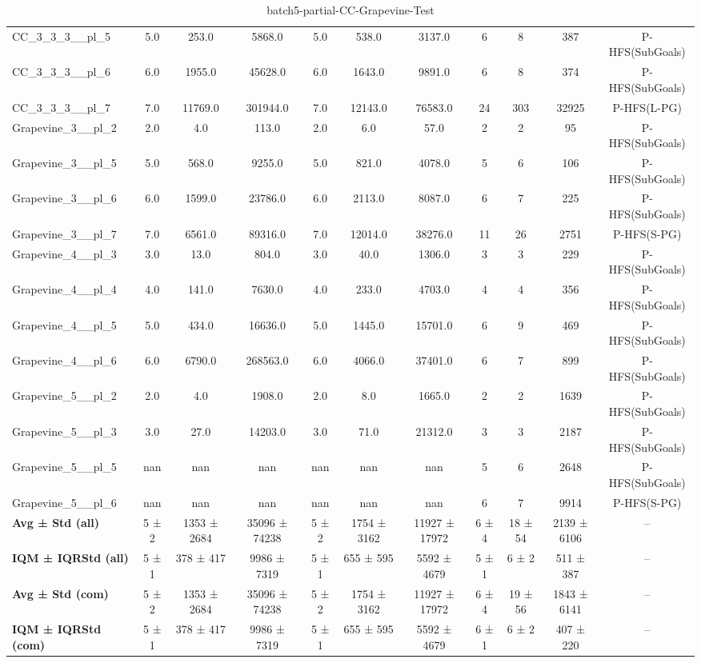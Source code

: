 \begin{table}[!ht]
\begin{tabular}{l|ccc|ccc|cccc}
CC\_3\_3\_3\_\_pl\_5 & 5.0 & 253.0 & 5868.0 & 5.0 & 538.0 & 3137.0 & 6 & 8 & 387 & P-HFS(SubGoals) \\
CC\_3\_3\_3\_\_pl\_6 & 6.0 & 1955.0 & 45628.0 & 6.0 & 1643.0 & 9891.0 & 6 & 8 & 374 & P-HFS(SubGoals) \\
CC\_3\_3\_3\_\_pl\_7 & 7.0 & 11769.0 & 301944.0 & 7.0 & 12143.0 & 76583.0 & 24 & 303 & 32925 & P-HFS(L-PG) \\
Grapevine\_3\_\_pl\_2 & 2.0 & 4.0 & 113.0 & 2.0 & 6.0 & 57.0 & 2 & 2 & 95 & P-HFS(SubGoals) \\
Grapevine\_3\_\_pl\_5 & 5.0 & 568.0 & 9255.0 & 5.0 & 821.0 & 4078.0 & 5 & 6 & 106 & P-HFS(SubGoals) \\
Grapevine\_3\_\_pl\_6 & 6.0 & 1599.0 & 23786.0 & 6.0 & 2113.0 & 8087.0 & 6 & 7 & 225 & P-HFS(SubGoals) \\
Grapevine\_3\_\_pl\_7 & 7.0 & 6561.0 & 89316.0 & 7.0 & 12014.0 & 38276.0 & 11 & 26 & 2751 & P-HFS(S-PG) \\
Grapevine\_4\_\_pl\_3 & 3.0 & 13.0 & 804.0 & 3.0 & 40.0 & 1306.0 & 3 & 3 & 229 & P-HFS(SubGoals) \\
Grapevine\_4\_\_pl\_4 & 4.0 & 141.0 & 7630.0 & 4.0 & 233.0 & 4703.0 & 4 & 4 & 356 & P-HFS(SubGoals) \\
Grapevine\_4\_\_pl\_5 & 5.0 & 434.0 & 16636.0 & 5.0 & 1445.0 & 15701.0 & 6 & 9 & 469 & P-HFS(SubGoals) \\
Grapevine\_4\_\_pl\_6 & 6.0 & 6790.0 & 268563.0 & 6.0 & 4066.0 & 37401.0 & 6 & 7 & 899 & P-HFS(SubGoals) \\
Grapevine\_5\_\_pl\_2 & 2.0 & 4.0 & 1908.0 & 2.0 & 8.0 & 1665.0 & 2 & 2 & 1639 & P-HFS(SubGoals) \\
Grapevine\_5\_\_pl\_3 & 3.0 & 27.0 & 14203.0 & 3.0 & 71.0 & 21312.0 & 3 & 3 & 2187 & P-HFS(SubGoals) \\
Grapevine\_5\_\_pl\_5 & nan & nan & nan & nan & nan & nan & 5 & 6 & 2648 & P-HFS(SubGoals) \\
Grapevine\_5\_\_pl\_6 & nan & nan & nan & nan & nan & nan & 6 & 7 & 9914 & P-HFS(S-PG) \\
\hline
\textbf{Avg ± Std (all)} & 5 ± 2 & 1353 ± 2684 & 35096 ± 74238 & 5 ± 2 & 1754 ± 3162 & 11927 ± 17972 & 6 ± 4 & 18 ± 54 & 2139 ± 6106 & -- \\
\textbf{IQM ± IQRStd (all)} & 5 ± 1 & 378 ± 417 & 9986 ± 7319 & 5 ± 1 & 655 ± 595 & 5592 ± 4679 & 5 ± 1 & 6 ± 2 & 511 ± 387 & -- \\
\textbf{Avg ± Std (com)} & 5 ± 2 & 1353 ± 2684 & 35096 ± 74238 & 5 ± 2 & 1754 ± 3162 & 11927 ± 17972 & 6 ± 4 & 19 ± 56 & 1843 ± 6141 & -- \\
\textbf{IQM ± IQRStd (com)} & 5 ± 1 & 378 ± 417 & 9986 ± 7319 & 5 ± 1 & 655 ± 595 & 5592 ± 4679 & 6 ± 1 & 6 ± 2 & 407 ± 220 & -- \\
\end{tabular}
\caption{batch5-partial-CC-Grapevine-Test}
\label{tab:batch5_partial_CC-Grapevine_comparison_test}
\end{table}
